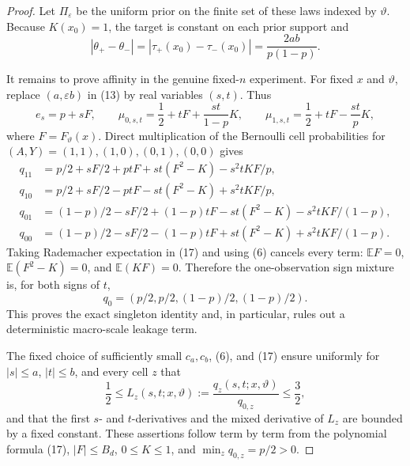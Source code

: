\documentclass{article}
\begin{document}
\begin{proof}
Let \(\Pi_\varepsilon\) be the uniform prior on the finite set of these laws indexed by \(\vartheta\).  Because \(K(x_0)=1\), the target is constant on each prior support and
\[
 |\theta_+-\theta_-|
 =|\tau_+(x_0)-\tau_-(x_0)|
 =\frac{2ab}{p(1-p)}.                                           \tag{15}
\]

It remains to prove affinity in the genuine fixed-\(n\) experiment.  For fixed \(x\) and \(\vartheta\), replace \((a,\varepsilon b)\) in (13) by real variables \((s,t)\).  Thus
\[
 e_s=p+sF,
 \qquad \mu_{0,s,t}=\frac12+tF+\frac{st}{1-p}K,
 \qquad \mu_{1,s,t}=\frac12+tF-\frac{st}{p}K,                  \tag{16}
\]
where \(F=F_\vartheta(x)\).  Direct multiplication of the Bernoulli cell probabilities for \((A,Y)=(1,1),(1,0),(0,1),(0,0)\) gives
\[
\begin{aligned}
 q_{11}&=p/2+sF/2+ptF+st(F^2-K)-s^2tKF/p,\\
 q_{10}&=p/2+sF/2-ptF-st(F^2-K)+s^2tKF/p,\\
 q_{01}&=(1-p)/2-sF/2+(1-p)tF-st(F^2-K)-s^2tKF/(1-p),\\
 q_{00}&=(1-p)/2-sF/2-(1-p)tF+st(F^2-K)+s^2tKF/(1-p).
                                                                    \tag{17}
\end{aligned}
\]
Taking Rademacher expectation in (17) and using (6) cancels every term: \(\mathbb E F=0\), \(\mathbb E(F^2-K)=0\), and \(\mathbb E(KF)=0\).  Therefore the one-observation sign mixture is, for both signs of \(t\),
\[
 q_0=(p/2,p/2,(1-p)/2,(1-p)/2).                                \tag{18}
\]
This proves the exact singleton identity and, in particular, rules out a deterministic macro-scale leakage term.

The fixed choice of sufficiently small \(c_a,c_b\), (6), and (17) ensure uniformly for \(|s|\le a\), \(|t|\le b\), and every cell \(z\) that
\[
 \frac12\le L_z(s,t;x,\vartheta):=\frac{q_z(s,t;x,\vartheta)}{q_{0,z}}
 \le\frac32,                                                     \tag{19}
\]
and that the first \(s\)- and \(t\)-derivatives and the mixed derivative of \(L_z\) are bounded by a fixed constant.  These assertions follow term by term from the polynomial formula (17), \(|F|\le B_d\), \(0\le K\le1\), and \(\min_zq_{0,z}=p/2>0\).


\end{proof}
\end{document}
